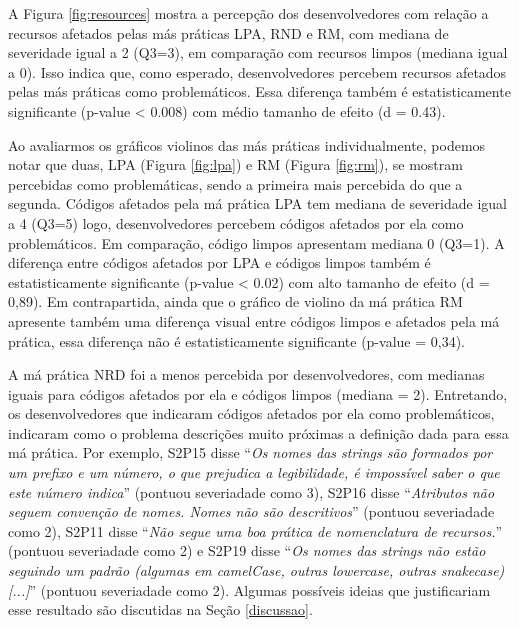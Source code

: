 A Figura \ref{fig:resources} mostra a percepção dos desenvolvedores com relação a recursos afetados pelas más práticas \textsc{LPA}, RND e \textsc{RM}, com mediana de severidade igual a 2 (Q3=3), em comparação com recursos limpos (mediana igual a 0). Isso indica que, como esperado, desenvolvedores percebem recursos afetados pelas más práticas como problemáticos. Essa diferença também é estatisticamente significante (p-value < 0.008) com médio tamanho de efeito (d = 0.43).


Ao avaliarmos os gráficos violinos das más práticas individualmente, podemos notar que duas, \textsc{LPA} (Figura \ref{fig:lpa}) e \textsc{RM} (Figura \ref{fig:rm}), se mostram percebidas como problemáticas, sendo a primeira mais percebida do que a segunda. Códigos afetados pela má prática \textsc{LPA} tem mediana de severidade igual a 4 (Q3=5) logo, desenvolvedores percebem códigos afetados por ela como problemáticos. Em comparação, código limpos apresentam mediana 0 (Q3=1). A diferença entre códigos afetados por \textsc{LPA} e códigos limpos também é estatisticamente significante (p-value < 0.02) com alto tamanho de efeito (d = 0,89). Em contrapartida, ainda que o gráfico de violino da má prática \textsc{RM} apresente também uma diferença visual entre códigos limpos e afetados pela má prática, essa diferença não é estatisticamente significante (p-value = 0,34).

A má prática \textsc{NRD} foi a menos percebida por desenvolvedores, com medianas iguais para códigos afetados por ela e códigos limpos (mediana = 2). Entretando, os desenvolvedores que indicaram códigos afetados por ela como problemáticos, indicaram como o problema descrições muito próximas a definição dada para essa má prática. Por exemplo, S2P15 disse ``\textit{Os nomes das strings são formados por um prefixo e um número, o que prejudica a legibilidade, é impossível saber o que este número indica}'' (pontuou severiadade como 3), S2P16 disse ``\textit{Atributos não seguem convenção de nomes. Nomes não são descritivos}'' (pontuou severiadade como 2), S2P11 disse ``\textit{Não segue uma boa prática de nomenclatura de recursos.}'' (pontuou severiadade como 2) e S2P19 disse ``\textit{Os nomes das strings não estão seguindo um padrão (algumas em camelCase, outras lowercase, outras snakecase) [...]}'' (pontuou severiadade como 2). Algumas possíveis ideias que justificariam esse resultado são discutidas na Seção \ref{discussao}. \\

